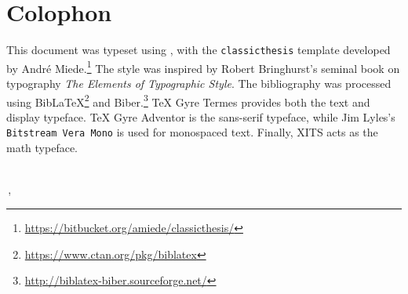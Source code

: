 \pagestyle{empty}

\hfill

\vfill


\section*{Colophon}
This document was typeset using \XeLaTeX, with the
\texttt{classicthesis} template developed by André Miede.\footnote{\url{https://bitbucket.org/amiede/classicthesis/}}
The style was inspired by Robert Bringhurst's seminal book on typography
\emph{The Elements of Typographic Style}.\autocite{Bringhurst2004-wn}
The bibliography was processed using
Bib\LaTeX\footnote{\url{https://www.ctan.org/pkg/biblatex}} and
Biber.\footnote{\url{http://biblatex-biber.sourceforge.net/}}
TeX Gyre Termes provides both the text and display typeface.
\textsf{TeX Gyre Adventor} is the sans-serif typeface, while Jim Lyles's
\texttt{Bitstream Vera Mono} is used for monospaced text.
Finally, XITS acts as the math typeface.

\bigskip
{\small
\noindent\textit{\myTitle}
\\
\noindent\textcopyright\,\finalVersion, \myName
}

%
%




